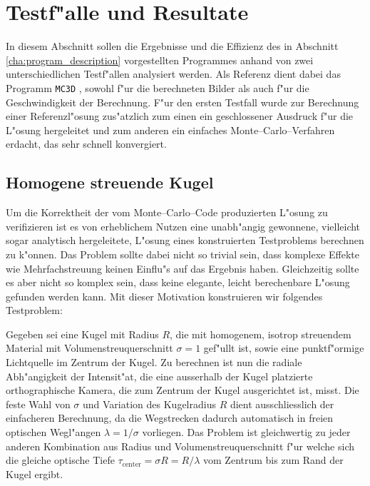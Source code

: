 	\chapter{Testf"alle und Resultate}
	In diesem Abschnitt sollen die Ergebnisse und die Effizienz des in Abschnitt \ref{cha:program_description} vorgestellten Programmes anhand von zwei unterschiedlichen Testf"allen analysiert werden. Als Referenz dient dabei das Programm \texttt{MC3D} \citep{Wolf:2003p12974}, sowohl f"ur die berechneten Bilder als auch f"ur die Geschwindigkeit der Berechnung. F"ur den ersten Testfall wurde zur Berechnung einer Referenzl"osung zus"atzlich zum einen ein geschlossener Ausdruck f"ur die L"osung hergeleitet und zum anderen ein einfaches Monte--Carlo--Verfahren erdacht, das sehr schnell konvergiert.
	
	\section{Homogene streuende Kugel}
	Um die Korrektheit der vom Monte--Carlo--Code produzierten L"osung zu verifizieren ist es von erheblichem Nutzen eine unabh"angig gewonnene, vielleicht sogar analytisch hergeleitete, L"osung eines konstruierten Testproblems berechnen zu k"onnen. Das Problem sollte dabei nicht so trivial sein, dass komplexe Effekte wie Mehrfachstreuung keinen Einflu"s auf das Ergebnis haben. Gleichzeitig sollte es aber nicht so komplex sein, dass keine elegante, leicht berechenbare L"osung gefunden werden kann.
	Mit dieser Motivation konstruieren wir folgendes Testproblem:
		
	Gegeben sei eine Kugel mit Radius $R$, die mit homogenem, isotrop streuendem Material mit Volumenstreuquerschnitt $\sigma=1$ gef"ullt ist, sowie eine punktf"ormige Lichtquelle im Zentrum der Kugel. Zu berechnen ist nun die radiale Abh"angigkeit der Intensit"at, die eine ausserhalb der Kugel platzierte orthographische Kamera, die zum Zentrum der Kugel ausgerichtet ist, misst. Die feste Wahl von $\sigma$ und Variation des Kugelradius $R$ dient ausschliesslich der einfacheren Berechnung, da die Wegstrecken dadurch automatisch in freien optischen  Wegl"angen $\lambda=1/\sigma$ vorliegen. Das Problem ist gleichwertig zu jeder anderen Kombination aus Radius und Volumenstreuquerschnitt f"ur welche sich die gleiche optische Tiefe $\tau_\text{center}=\sigma R=R/\lambda$ vom Zentrum bis zum Rand der Kugel ergibt.
	
